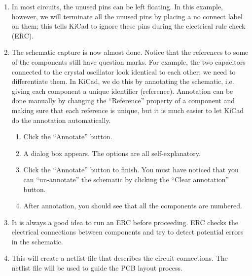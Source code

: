 \documentclass[12pt,letterpaper]{scrartcl}
\begin{document}
\begin{enumerate}
	\item In most circuits, the unused pins can be left floating. In this example, however, we will terminate all the unused pins by placing a no connect label on them; this tells KiCad to ignore these pins during the electrical rule check (ERC).
	
	\item The schematic capture is now almost done. Notice that the references to some of the components still have question marks. For example, the two capacitors connected to the crystal oscillator look identical to each other; we need to differentiate them. In KiCad, we do this by annotating the schematic, i.e. giving each component a unique identifier (reference). Annotation can be done manually by changing the ``Reference'' property of a component and making sure that each reference is unique, but it is much easier to let KiCad do the annotation automatically. 
		\begin{enumerate}
			\item Click the ``Annotate'' button. 
			\item A dialog box appears. The options are all self-explanatory. 
		
			\item Click the ``Annotate'' button to finish. You must have noticed that you can ``un-annotate'' the schematic by clicking the ``Clear annotation'' button. 
			
			\item After annotation, you should see that all the components are numbered. 
		\end{enumerate}
		
	\item It is always a good idea to run an ERC before proceeding. ERC checks the electrical connections between components and try to detect potential errors in the schematic.
	
	
	\item This will create a netlist file that describes the circuit connections. The netlist file will be used to guide the PCB layout process.
	

\end{enumerate}
\end{document}
